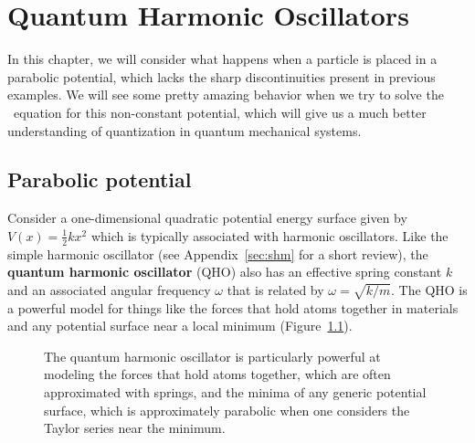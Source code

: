 %

%

\chapter{Quantum Harmonic Oscillators} \label{ch:qho}
In this chapter, we will consider what happens when a particle is placed in a parabolic potential, which lacks the sharp discontinuities present in previous examples. We will see some pretty amazing behavior when we try to solve the \Sch\ equation for this non-constant potential, which will give us a much better understanding of quantization in quantum mechanical systems.


\section{Parabolic potential}
Consider a one-dimensional quadratic potential energy surface given by $V(x)=\frac{1}{2}kx^2$ which is typically associated with harmonic oscillators. Like the simple harmonic oscillator (see Appendix~\ref{sec:shm} for a short review), the \textbf{quantum harmonic oscillator} (QHO) also has an effective spring constant $k$ and an associated angular frequency $\omega$ that is related by $\omega = \sqrt{k/m}$. The QHO is a powerful model for things like the forces that hold atoms together in materials and any potential surface near a local minimum (Figure~\ref{fig:qpot}).

\begin{figure}[!h]
	\centering
	 \hspace{4ex}
	\caption{The quantum harmonic oscillator is particularly powerful at modeling \protect{} the forces that hold atoms together, which are often approximated with springs, and \protect{} the minima of any generic potential surface, which is approximately parabolic when one considers the Taylor series near the minimum.}
	\label{fig:qpot}
\end{figure}

